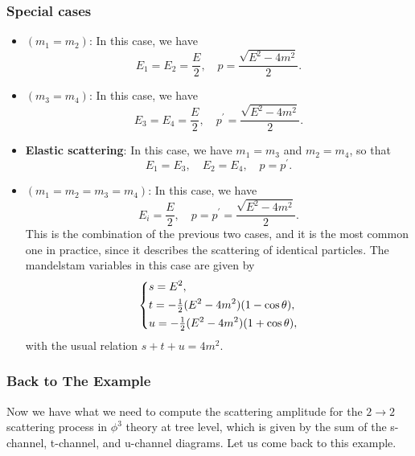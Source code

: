 \subsubsection{Special cases}

\begin{itemize}
    \item \((m_1 = m_2)\): In this case, we have
          \[
              E_1 = E_2 = \frac{E}{2}, \quad p = \frac{\sqrt{E^2 - 4 m^2}}{2}.
          \]
    \item \((m_3 = m_4)\): In this case, we have
          \[
              E_3 = E_4 = \frac{E}{2}, \quad p^{\prime} = \frac{\sqrt{E^2 - 4 m^2}}{2}.
          \]
    \item \textbf{Elastic scattering}: In this case, we have \(m_1 = m_3\) and \(m_2 = m_4\), so that
          \[
              E_1 = E_3, \quad E_2 = E_4, \quad p = p^{\prime}.
          \]
    \item \((m_1 = m_2 = m_3 = m_4)\): In this case, we have
          \[
              E_i = \frac{E}{2}, \quad p = p^{\prime} = \frac{\sqrt{E^2 - 4 m^2}}{2}.
          \]
          This is the combination of the previous two cases, and it is the most common one in practice, since it describes the scattering of identical particles. The mandelstam variables in this case are given by
          \[
              \begin{dcases}
                  s = E^2,                                         \\
                  t = -\tfrac{1}{2}(E^2 - 4 m^2)(1 - \cos \theta), \\
                  u = -\tfrac{1}{2}(E^2 - 4 m^2)(1 + \cos \theta),
              \end{dcases}
          \]
          with the usual relation \(s + t + u = 4 m^2\).
\end{itemize}

\subsubsection{Back to The Example}

Now we have what we need to compute the scattering amplitude for the \(2 \to 2\) scattering process in \(\phi^3\) theory at tree level, which is given by the sum of the s-channel, t-channel, and u-channel diagrams. Let us come back to this example.

